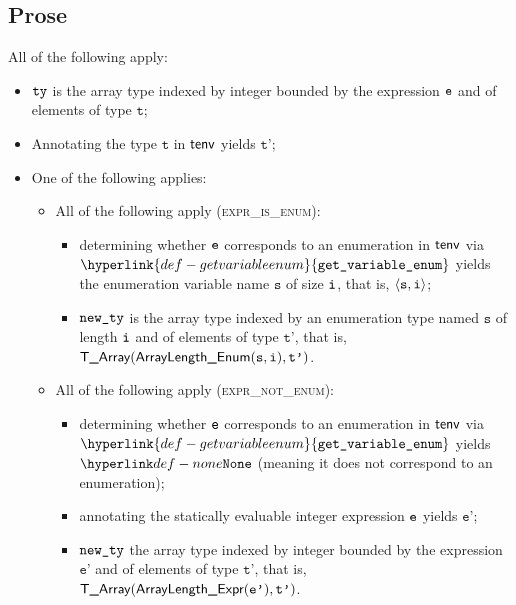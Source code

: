 \documentclass{book}
\newcommand\ProseOrTypeError[0]{\ProseTerminateAs{\TypeErrorConfig}}
\newcommand\getvariableenum[0]{\hyperlink{def-getvariableenum}{\texttt{get\_variable\_enum}}}
\newcommand\vt[0]{\texttt{t}}
\newcommand\vs[0]{\texttt{s}}
\newcommand\vep[0]{\texttt{e'}}
\newcommand\vtp[0]{\texttt{t'}}
\begin{document}
\subsection{Prose}
All of the following apply:
\begin{itemize}
  \item $\texttt{ty}$ is the array type indexed by integer bounded by the
    expression $\texttt{e}$ and of elements of type $\vt$;
  \item Annotating the type $\vt$ in $\textsf{tenv}$ yields $\vtp$\ProseOrTypeError;
  \item One of the following applies:
  \begin{itemize}
    \item All of the following apply (\textsc{expr\_is\_enum}):
    \begin{itemize}
      \item determining whether $\texttt{e}$ corresponds to an enumeration in $\textsf{tenv}$
      via \\ $\getvariableenum$ yields the enumeration variable
      name $\vs$ of size $\texttt{i}$, that is, $\langle \vs, \vi \rangle$\ProseOrTypeError;
      \item $\texttt{new\_ty}$ is the array type indexed by an enumeration type
      named $\vs$ of length $\texttt{i}$ and of elements of type $\vtp$, that is, $\TArray(\ArrayLengthEnum(\vs, \vi), \vtp)$.
    \end{itemize}

    \item All of the following apply (\textsc{expr\_not\_enum}):
    \begin{itemize}
      \item determining whether $\texttt{e}$ corresponds to an enumeration in $\textsf{tenv}$
      via \\ $\getvariableenum$ yields $\None$ (meaning it does not
      correspond to an enumeration)\ProseOrTypeError;
      \item annotating the statically evaluable integer expression $\texttt{e}$ yields
      $\vep$\ProseOrTypeError;
      \item $\texttt{new\_ty}$ the array type indexed by integer bounded by
      the expression $\vep$ and of elements of type $\vtp$, that is,
      $\TArray(\ArrayLengthExpr(\vep), \vtp)$.
    \end{itemize}


\end{itemize}
\end{itemize}
\end{document}
